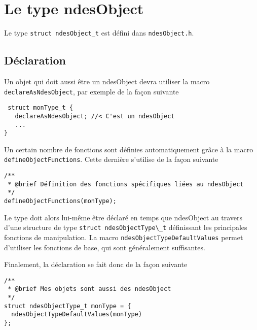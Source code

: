 %
\section{Le type ndesObject}

   Le type {\tt struct ndesObject\_t} est défini dans {\tt ndesObject.h}.

%
\subsection{Déclaration}

   Un objet qui doit aussi être un ndesObject devra utiliser la macro
   \lstinline{declareAsNdesObject}, par exemple de la façon suivante


\begin{verbatim}
 struct monType_t {
   declareAsNdesObject; //< C'est un ndesObject 
   ...
}
\end{verbatim}

   Un certain nombre de fonctions sont définies automatiquement grâce
à la macro \lstinline{defineObjectFunctions}. Cette dernière s'utilise
de la façon suivante

\begin{verbatim}
/**
 * @brief Définition des fonctions spécifiques liées au ndesObject
 */
defineObjectFunctions(monType);
\end{verbatim}

   Le type doit alors lui-même être déclaré en temps que ndesObject au
travers d'une structure de type \lstinline{struct ndesObjectType\_t}
définissant les principales fonctions de manipulation. La macro
\lstinline{ndesObjectTypeDefaultValues} permet d'utiliser les
fonctions de base, qui sont généralement suffisantes.

   Finalement, la déclaration se fait donc de la façon suivante
   
\begin{verbatim}
/**
 * @brief Mes objets sont aussi des ndesObject
 */
struct ndesObjectType_t monType = {
  ndesObjectTypeDefaultValues(monType)
};
\end{verbatim}


%
